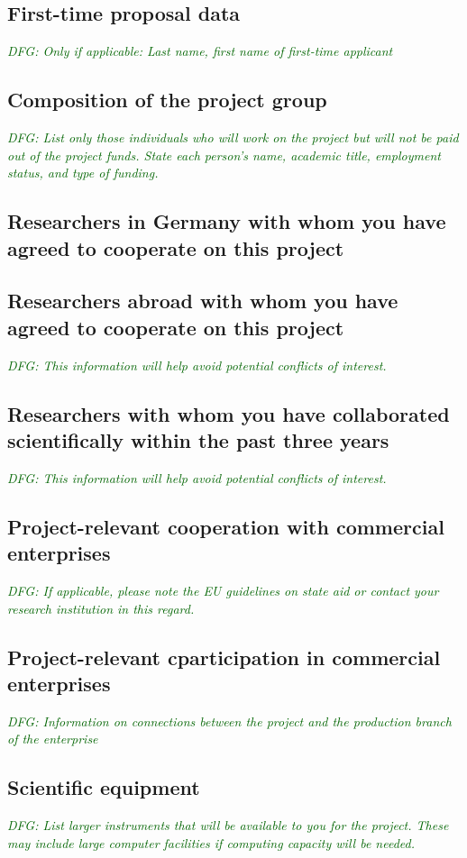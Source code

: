 \documentclass[a4paper,11pt]{amsart}
\theoremstyle{definition}
\newcommand{\<}{\langle}
\renewcommand{\>}{\rangle}
\newcommand{\dfg}[1]{\emph{\textcolor{darkgreen}{DFG: #1}}}
\begin{document}
\subsection{First-time proposal data}
\dfg{Only if applicable: Last name, first name of first-time
  applicant}

\subsection{Composition of the project group}
\dfg{List only those individuals who will work on the project but will
  not be paid out of the project funds. State each person’s name,
  academic title, employment status, and type of funding.}

\subsection{Researchers in Germany with whom you have agreed to cooperate on this project}

\subsection{Researchers abroad with whom you have agreed to cooperate on this project}
\dfg{This information will help avoid potential conflicts of
  interest.}

\subsection{Researchers with whom you have collaborated scientifically within the past three years}
\dfg{This information will help avoid potential conflicts of interest.}

\subsection{Project-relevant cooperation with commercial enterprises}
\dfg{If applicable, please note the EU guidelines on state aid or
  contact your research institution in this regard.}

\subsection{Project-relevant cparticipation in commercial enterprises}
\dfg{Information on connections between the project and the production
  branch of the enterprise}

\subsection{Scientific equipment}
\dfg{List larger instruments that will be available to you for the
  project. These may include large computer facilities if computing
  capacity will be needed.}
\end{document}
